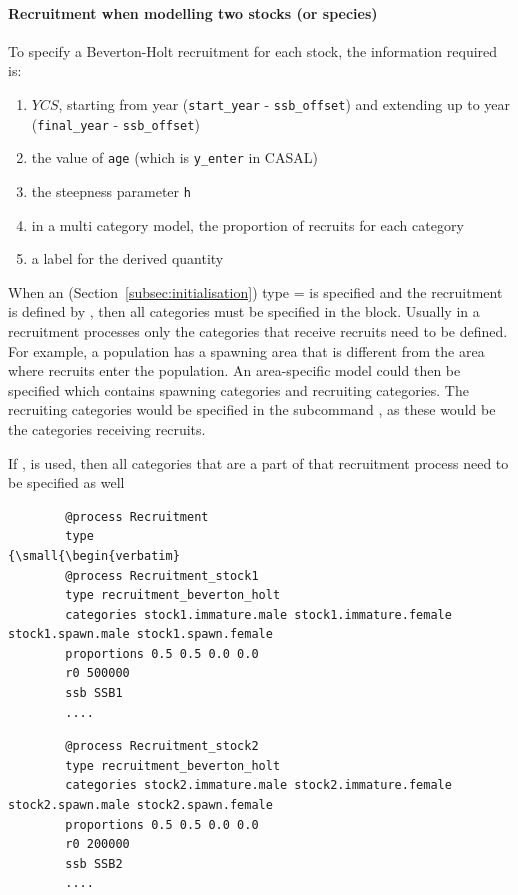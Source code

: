 \paragraph*{Recruitment when modelling two stocks (or species)}
To specify a Beverton-Holt recruitment for each stock, the information required is:

\begin{enumerate}
	\item $YCS$, starting from year (\texttt{start\_year} - \texttt{ssb\_offset}) and extending up to year (\texttt{final\_year} - \texttt{ssb\_offset})
	\item the value of \texttt{age} (which is \texttt{y\_enter} in CASAL)
	\item the steepness parameter \texttt{h}
	\item in a multi category model, the proportion of recruits for each category
	\item a label for the derived quantity
\end{enumerate}

When an  (Section~\ref{subsec:initialisation}) type =  is specified and the recruitment is defined by , then all categories must be specified in the  block. Usually in a recruitment processes only the categories that receive recruits need to be defined. For example, a population has a spawning area that is different from the area where recruits enter the population. An area-specific model could then be specified which contains spawning categories and recruiting categories. The recruiting categories would be specified in the subcommand , as these would be the categories receiving recruits.

If ,  is used, then all categories that are a part of that recruitment process need to be specified as well

{\small{\begin{verbatim}
		@process Recruitment
		type 
{\small{\begin{verbatim}
		@process Recruitment_stock1
		type recruitment_beverton_holt
		categories stock1.immature.male stock1.immature.female stock1.spawn.male stock1.spawn.female
		proportions 0.5 0.5 0.0 0.0
		r0 500000
		ssb SSB1
		....
		\end{verbatim}}}


{\small{\begin{verbatim}
		@process Recruitment_stock2
		type recruitment_beverton_holt
		categories stock2.immature.male stock2.immature.female stock2.spawn.male stock2.spawn.female
		proportions 0.5 0.5 0.0 0.0
		r0 200000
		ssb SSB2
		....
		\end{verbatim}}}

